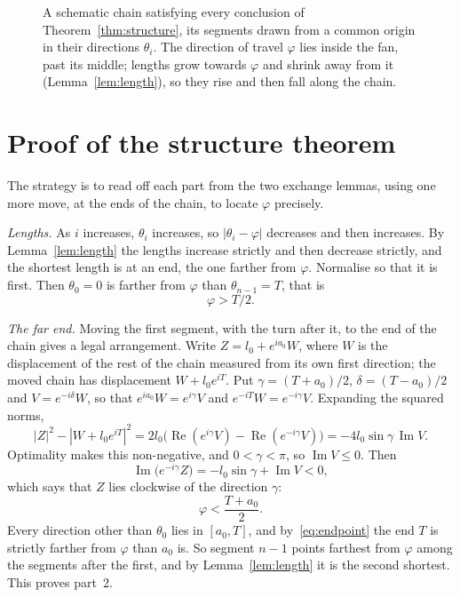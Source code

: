 \documentclass[11pt]{article}
\theoremstyle{remark}
\begin{document}
\begin{figure}[ht]
\centering
{}
\caption{A schematic chain satisfying every conclusion of Theorem~\ref{thm:structure}, its segments drawn from a common origin in their directions $\theta_i$. The direction of travel $\varphi$ lies inside the fan, past its middle; lengths grow towards $\varphi$ and shrink away from it (Lemma~\ref{lem:length}), so they rise and then fall along the chain.}
\label{fig:fan}
\end{figure}

\section{Proof of the structure theorem}\label{sec:structure}

The strategy is to read off each part from the two exchange lemmas, using one more move, at the ends of the chain, to locate $\varphi$ precisely.

\emph{Lengths.} As $i$ increases, $\theta_i$ increases, so $|\theta_i-\varphi|$ decreases and then increases. By Lemma~\ref{lem:length} the lengths increase strictly and then decrease strictly, and the shortest length is at an end, the one farther from $\varphi$. Normalise so that it is first. Then $\theta_0=0$ is farther from $\varphi$ than $\theta_{n-1}=T$, that is
\begin{equation}\label{eq:half}
\varphi>T/2 .
\end{equation}

\emph{The far end.} Moving the first segment, with the turn after it, to the end of the chain gives a legal arrangement. Write $Z=l_0+e^{ia_0}W$, where $W$ is the displacement of the rest of the chain measured from its own first direction; the moved chain has displacement $W+l_0e^{iT}$. Put $\gamma=(T+a_0)/2$, $\delta=(T-a_0)/2$ and $V=e^{-i\delta}W$, so that $e^{ia_0}W=e^{i\gamma}V$ and $e^{-iT}W=e^{-i\gamma}V$. Expanding the squared norms,
\[
|Z|^2-|W+l_0e^{iT}|^2=2l_0\bigl(\operatorname{Re}(e^{i\gamma}V)-\operatorname{Re}(e^{-i\gamma}V)\bigr)=-4l_0\sin\gamma\,\operatorname{Im}V .
\]
Optimality makes this non-negative, and $0<\gamma<\pi$, so $\operatorname{Im}V\le0$. Then
\[
\operatorname{Im}\bigl(e^{-i\gamma}Z\bigr)=-l_0\sin\gamma+\operatorname{Im}V<0 ,
\]
which says that $Z$ lies clockwise of the direction $\gamma$:
\begin{equation}\label{eq:endpoint}
\varphi<\frac{T+a_0}{2} .
\end{equation}
Every direction other than $\theta_0$ lies in $[a_0,T]$, and by~\eqref{eq:endpoint} the end $T$ is strictly farther from $\varphi$ than $a_0$ is. So segment $n-1$ points farthest from $\varphi$ among the segments after the first, and by Lemma~\ref{lem:length} it is the second shortest. This proves part~2.
\end{document}
